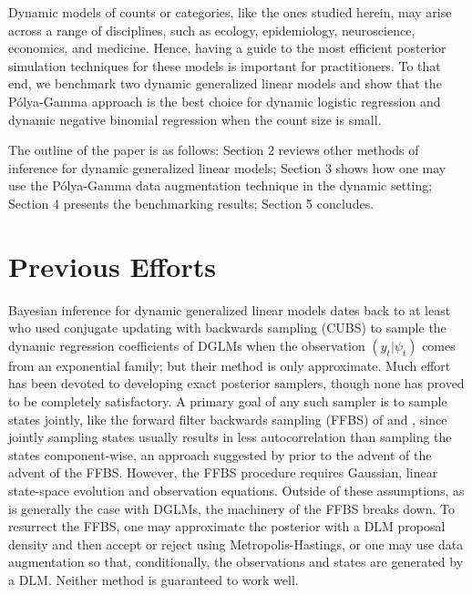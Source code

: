 \documentclass[12pt]{article}
\newcommand{\Polya}{P\'{o}lya}
\begin{document}
Dynamic models of counts or categories, like the ones studied herein, may arise
across a range of disciplines, such as ecology, epidemiology, neuroscience,
economics, and medicine.  Hence, having a guide to the most efficient posterior
simulation techniques for these models is important for practitioners.  To that
end, we benchmark two dynamic generalized linear models and show that the
\Polya-Gamma approach is the best choice for dynamic logistic regression and
dynamic negative binomial regression when the count size is small.

The outline of the paper is as follows: Section 2 reviews other methods of
inference for dynamic generalized linear models; Section 3 shows how one may use
the \Polya-Gamma data augmentation technique in the dynamic setting; Section 4
presents the benchmarking results; Section 5 concludes.

\section{Previous Efforts}
\label{sec:previous-efforts}

Bayesian inference for dynamic generalized linear models dates back to
at least \cite{west-etal-1985} who used conjugate updating with backwards
sampling (CUBS) to sample the dynamic regression coefficients of DGLMs when the
observation $(y_t | \psi_t)$ comes from an exponential family; but their method
is only approximate.  Much effort has been devoted to developing exact posterior
samplers, though none has proved to be completely satisfactory.  A primary goal
of any such sampler is to sample states jointly, like the forward filter
backwards sampling (FFBS) of \cite{fruhwirth-schnatter-1994} and
\cite{carter-kohn-1994}, since jointly sampling states usually results in less
autocorrelation than sampling the states component-wise, an approach suggested
by \cite{carlin-etal-1992} prior to the advent of the advent of the FFBS.
However, the FFBS procedure requires Gaussian, linear state-space evolution and
observation equations.  Outside of these assumptions, as is generally the case
with DGLMs, the machinery of the FFBS breaks down.  To resurrect the FFBS, one
may approximate the posterior with a DLM proposal density and then accept or
reject using Metropolis-Hastings, or one may use data augmentation so that,
conditionally, the observations and states are generated by a DLM.  Neither
method is guaranteed to work well.
\end{document}
